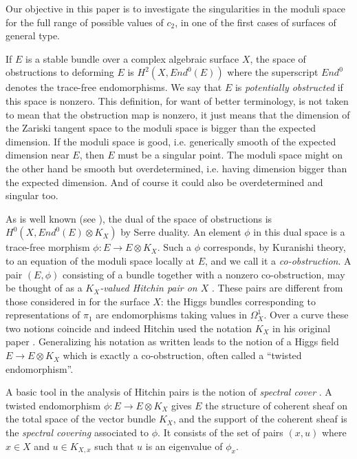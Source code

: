 \documentclass{amsart}
\theoremstyle{plain}
\numberwithin{equation}{section}
\begin{document}
Our objective in this paper is to investigate 
the singularities in the moduli space for the full range of possible values of $c_2$, in one of the first cases of surfaces of general type.

If $E$ is a stable bundle over
a complex algebraic surface $X$, the space
of obstructions to deforming $E$ is $H^2(X,End ^0(E))$ where the superscript $End^0$ denotes the trace-free endomorphisms. 
We say that $E$ is {\em potentially obstructed} if this space is nonzero. 
This definition, for want of better terminology, is not taken to mean that the obstruction 
map is nonzero, it just means that the
dimension of the Zariski tangent space to the moduli space is bigger than the expected
dimension. If the moduli space is good, i.e. generically smooth of the expected dimension
near $E$, then $E$ must be a singular point. The  moduli space might on the
other hand be smooth but overdetermined, i.e. having dimension bigger than the
expected dimension. And of course it could also be overdetermined and singular too.

As is well known (see \cite{Donaldson} \cite{Zuo} \cite[\S 1]{OGradyQuest} \cite{Langer}), 
the dual of the space of obstructions is
$H^0(X,End ^0(E)\otimes K_X)$ by Serre duality. 
An element
$\phi $ in this dual space is a trace-free morphism $\phi : E\rightarrow E\otimes K_X$.
Such a $\phi$ corresponds, by Kuranishi theory,
to an equation of the moduli space locally at $E$, and we call it a {\em co-obstruction}.
A pair $(E,\phi )$ consisting of a bundle together with a nonzero co-obstruction, may
be thought of as a {\em $K_X$-valued Hitchin pair on $X$} \cite{Hitchin}. These pairs are
different from those considered in \cite{hbls} for the surface $X$: the 
Higgs bundles corresponding to representations of $\pi _1$ are endomorphisms taking
values in $\Omega ^1_X$. Over a curve these two notions coincide and indeed Hitchin used
the notation $K_X$ in his original paper \cite{Hitchin}. Generalizing his notation
as written leads to the notion of a Higgs field $E\rightarrow E\otimes K_X$
which is exactly a co-obstruction, often called a ``twisted endomorphism''. 

A basic tool in the analysis of Hitchin pairs is the notion of {\em spectral cover}
\cite{Hitchin} \cite{Donagi} \cite{BNR} \cite{Zuo}.
A twisted endomorphism $\phi :E\rightarrow E\otimes K_X$ gives $E$ the structure of coherent
sheaf on the total space of the vector bundle $K_X$, and the support of the 
coherent sheaf is the {\em spectral covering} associated to $\phi$. 
It consists of the set of pairs $(x,u)$ where $x\in X$ and $u\in K_{X,x}$ such that
$u$ is an eigenvalue of $\phi _x$. 
\end{document}
